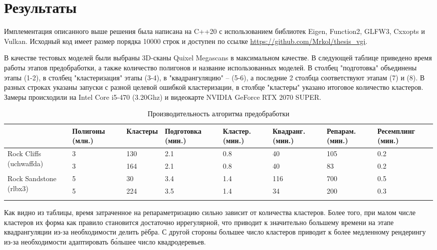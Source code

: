 \documentclass[12pt]{extarticle}
\begin{document}
\section{Результаты}
Имплементация описанного выше решения была написана на C++20 с использованием библиотек Eigen, Function2, GLFW3, Cxxopts и Vulkan. Исходный код имеет размер порядка 10000 строк и доступен по ссылке \url{https://github.com/Mrkol/thesis_vgi}.

В качестве тестовых моделей были выбраны 3D-сканы Quixel Megascans \cite{quixel_megascans} в максимальном качестве. В следующей таблице приведено время работы этапов предобработки, а также количество полигонов и название использованных моделей. В столбец "подготовка" объединены этапы (1-2), в столбец "кластеризация" этапы (3-4), в "квадрангуляцию" -- (5-6), а последние 2 столбца соответствуют этапам (7) и (8). В разных строках указаны запуски с разной целевой ошибкой кластеризации, в столбце "кластеры" указано итоговое количество кластеров. Замеры происходили на Intel Core i5-470 (3.20Ghz) и видеокарте NVIDIA GeForce RTX 2070 SUPER.

\begin{table}[ht]
\small
\centering
\begin{tabular}{ l | p{16mm} | p{15mm} | p{17mm} | p{12mm} | p{14mm} | p{13mm} | p{17mm} }
                        & Полигоны (млн.) & Кластеры & Подготовка (мин.) & Кластер. (мин.) & Квадранг. (мин.) & Репарам. (мин.) & Ресемплинг (мин.) \\
\hline
\multirow{2}{18mm}{Rock Cliffs (uchwaffda)}
& 3    & 130 & 2.1   & 0.8  & 40   & 105    & 0.2   \\
& 3    & 164 & 2.1   & 0.8  & 40   & 83     & 0.2   \\
\hline
\multirow{3}{16mm}{Rock Sandstone (rlbx3)}
& 5    & 30  & 3.4   & 1.4  & 116  & 700    & 0.5   \\
& 5    & 224 & 3.5   & 1.4  & 34   & 200    & 0.3   \\
&&&&&&&\\
\end{tabular}
\caption{Производительность алгоритма предобработки}
\end{table}

Как видно из таблицы, время затраченное на репараметризацию сильно зависит от количества кластеров. Более того, при малом числе кластеров их форма как правило становится достаточно иррегулярной, что приводит к значительно большему времени на этапе квадрангуляции из-за необходимости делить рёбра. С другой стороны большее число кластеров приводит к более медленному рендерингу из-за необходимости адаптировать б\'ольшее число квадродеревьев.
\end{document}
